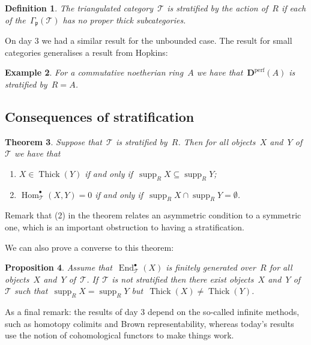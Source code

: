 \documentclass[10pt,a4paper]{article}
\theoremstyle{lecture}
\newtheorem{theorem}{Theorem}
\newtheorem{definition}[theorem]{Definition}
\newtheorem{example}[theorem]{Example}
\newtheorem{proposition}[theorem]{Proposition}
\newcommand\derived{\ensuremath{\mathbf{D}}}
\newcommand\perf{\ensuremath{\mathrm{perf}}}
\DeclareMathOperator\End{End}
\DeclareMathOperator\Hom{Hom}
\DeclareMathOperator\supp{supp}
\DeclareMathOperator\Thick{Thick}
\begin{document}
\begin{definition}
  The triangulated category~$\mathcal{T}$ is \emph{stratified by the action of~$R$} if each of the~$\Gamma_{\mathfrak{p}}(\mathcal{T})$ has no proper thick subcategories.
\end{definition}

On day 3 we had a similar result for the unbounded case. The result for small categories generalises a result from Hopkins:
\begin{example}
  For a commutative noetherian ring~$A$ we have that~$\derived^\perf(A)$ is stratified by~$R=A$.
\end{example}

\subsection{Consequences of stratification}
\begin{theorem}
  Suppose that~$\mathcal{T}$ is stratified by~$R$. Then for all objects~$X$ and~$Y$ of~$\mathcal{T}$ we have that
  \begin{enumerate}
    \item $X\in\Thick(Y)$ if and only if~$\supp_R X\subseteq\supp_R Y$;
    \item $\Hom_{\mathcal{T}}^\bullet(X,Y)=0$ if and only if~$\supp_R X\cap\supp_R Y=\emptyset$.
  \end{enumerate}
\end{theorem}
Remark that (2) in the theorem relates an asymmetric condition to a symmetric one, which is an important obstruction to having a stratification.

We can also prove a converse to this theorem:
\begin{proposition}
  Assume that~$\End_{\mathcal{T}}^\bullet(X)$ is finitely generated over~$R$ for all objects~$X$ and~$Y$ of~$\mathcal{T}$. If~$\mathcal{T}$ is not stratified then there exist objects~$X$ and~$Y$ of~$\mathcal{T}$ such that~$\supp_R X=\supp_R Y$ but~$\Thick(X)\neq\Thick(Y)$.
\end{proposition}

As a final remark: the results of day 3 depend on the so-called infinite methods, such as homotopy colimits and Brown representability, whereas today's results use the notion of cohomological functors to make things work.
\end{document}
